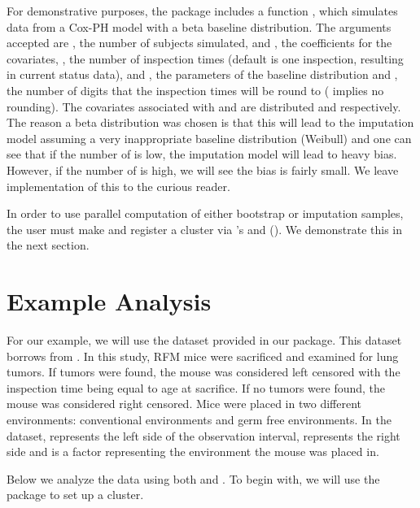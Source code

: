 \documentclass[article]{jss}
\begin{document}
{	For demonstrative purposes, the package includes a function , which simulates data from a Cox-PH model with a beta baseline distribution. The arguments accepted are , the number of subjects simulated,  and , the coefficients for the covariates, , the number of inspection times (default is one inspection, resulting in current status data),  and , the parameters of the baseline distribution and , the number of digits that the inspection times will be round to ( implies no rounding). The covariates associated with  and  are distributed  and  respectively. The reason a beta distribution was chosen is that this will lead to the imputation model assuming a very inappropriate baseline distribution (Weibull) and one can see that if the number of  is low, the imputation model will lead to heavy bias. However, if the number of  is high, we will see the bias is fairly small. We leave implementation of this to the curious reader. 
	
	In order to use parallel computation of either bootstrap or imputation samples, the user must make and register a cluster via 's  and  (\cite{doParallel}). We demonstrate this in the next section. 
	
{\section{Example Analysis}}
	 For our example, we will use the dataset  provided in our package. This dataset borrows from \cite{mice_tumors}. In this study, RFM mice were sacrificed and examined for lung tumors. If tumors were found, the mouse was considered left censored with the inspection time being equal to age at sacrifice. If no tumors were found, the mouse was considered right censored. Mice were placed in two different environments: conventional environments and germ free environments. In the  dataset,  represents the left side of the observation interval,  represents the right side and  is a factor representing the environment the mouse was placed in. 

	Below we analyze the data using both  and . To begin with, we will use the package  to set up a cluster.

}
\end{document}
